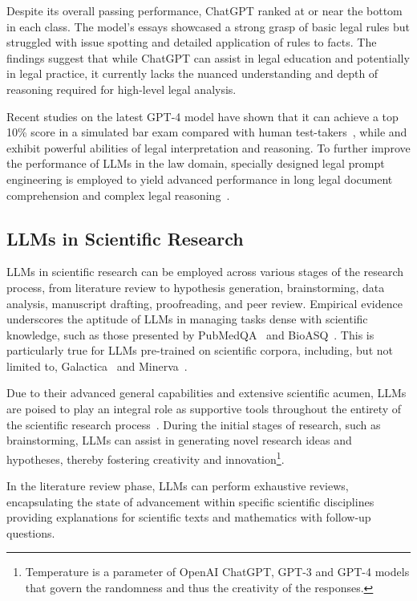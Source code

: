 Despite its overall passing performance, ChatGPT ranked at or near the bottom in each class.
The model's essays showcased a strong grasp of basic legal rules but struggled with issue spotting and detailed application of rules to facts.
The findings suggest that while ChatGPT can assist in legal education and potentially in legal practice, it currently lacks the nuanced understanding and depth of reasoning required for high-level legal analysis.

Recent studies on the latest GPT-4 model have shown that it can achieve a top 10\% score in a simulated bar exam compared with human test-takers~\cite{openai2024gpt4}, while \textcite{nay2022lawinformscode} and exhibit powerful abilities of legal interpretation and reasoning.
To further improve the performance of LLMs in the law domain, specially designed legal prompt engineering is employed to yield advanced performance in long legal document comprehension and complex legal reasoning~\cite{survey}.


\subsection{LLMs in Scientific Research}
\label{subsec:llms-in-scientific-research}

LLMs in scientific research can be employed across various stages of the research process, from literature review to hypothesis generation, brainstorming, data analysis, manuscript drafting, proofreading, and peer review.
Empirical evidence underscores the aptitude of LLMs in managing tasks dense with scientific knowledge, such as those presented by PubMedQA~\cite{jin2019pubmedqa} and BioASQ~\cite{krithara2022bioasq}.
This is particularly true for LLMs pre-trained on scientific corpora, including, but not limited to, Galactica~\cite{taylor2022galactica} and Minerva~\cite{lewkowycz2022minerva}.

Due to their advanced general capabilities and extensive scientific acumen, LLMs are poised to play an integral role as supportive tools throughout the entirety of the scientific research process~\cite{zhang2023smallstep}.
During the initial stages of research, such as brainstorming, LLMs can assist in generating novel research ideas and hypotheses, thereby fostering creativity and innovation\footnote{Temperature is a parameter of OpenAI ChatGPT, GPT-3 and GPT-4 models that govern the randomness and thus the creativity of the responses.}.

In the literature review phase, LLMs can perform exhaustive reviews, encapsulating the state of advancement within specific scientific disciplines~\cite{haman2023usingchatgpt, aydin2022openaichatgpt} providing explanations for scientific texts and mathematics with follow-up questions.

